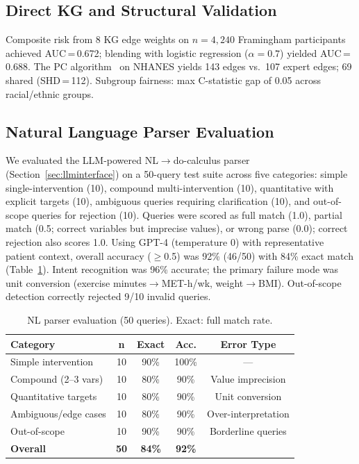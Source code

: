 \documentclass[runningheads]{llncs}
\begin{document}
\subsection{Direct KG and Structural Validation}\label{sec:directkg}

Composite risk from 8 KG edge weights on $n = 4{,}240$
Framingham participants achieved AUC\,=\,0.672; blending with
logistic regression ($\alpha\!=\!0.7$) yielded AUC\,=\,0.688.
The PC algorithm~\cite{spirtes2000causation} on NHANES yields
143 edges vs.\ 107 expert edges; 69 shared (SHD\,=\,112).
Subgroup fairness: max C-statistic gap of 0.05 across
racial/ethnic groups.

\subsection{Natural Language Parser Evaluation}\label{sec:nleval}

We evaluated the LLM-powered NL$\to$do-calculus parser
(Section~\ref{sec:llminterface}) on a 50-query test suite across
five categories: simple single-intervention (10), compound
multi-intervention (10), quantitative with explicit targets (10),
ambiguous queries requiring clarification (10), and out-of-scope
queries for rejection (10).
Queries were scored as full match (1.0), partial match (0.5;
correct variables but imprecise values), or wrong parse (0.0);
correct rejection also scores 1.0.
Using GPT-4 (temperature 0) with representative patient context,
overall accuracy ($\geq$0.5) was 92\% (46/50) with 84\% exact
match (Table~\ref{tab:nlparser}).
Intent recognition was 96\% accurate; the primary failure mode
was unit conversion (exercise minutes$\to$MET-h/wk, weight$\to$BMI).
Out-of-scope detection correctly rejected 9/10 invalid queries.

\renewcommand{\arraystretch}{1.05}
\begin{table}[t]
\centering
\caption{NL parser evaluation (50 queries). Exact: full match rate.}\label{tab:nlparser}
\small
\begin{tabular}{@{}lcccc@{}}
\toprule
\textbf{Category} & \textbf{n} & \textbf{Exact} & \textbf{Acc.} & \textbf{Error Type} \\
\midrule
Simple intervention & 10 & 90\% & 100\% & --- \\
Compound (2--3 vars) & 10 & 80\% & 90\% & Value imprecision \\
Quantitative targets & 10 & 80\% & 90\% & Unit conversion \\
Ambiguous/edge cases & 10 & 80\% & 90\% & Over-interpretation \\
Out-of-scope & 10 & 90\% & 90\% & Borderline queries \\
\midrule
\textbf{Overall} & \textbf{50} & \textbf{84\%} & \textbf{92\%} & \\
\bottomrule
\end{tabular}
\end{table}
\renewcommand{\arraystretch}{1.0}
\end{document}
